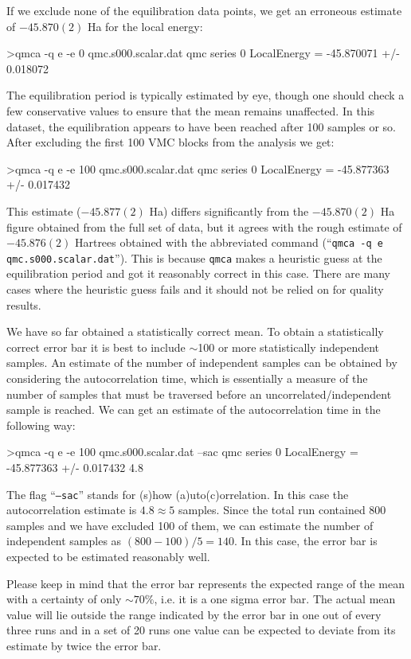If we exclude none of the equilibration data points, we get an 
erroneous estimate of $-45.870(2)$ Ha for the local energy:
\begin{shade}
>qmca -q e -e 0 qmc.s000.scalar.dat 
qmc  series 0  LocalEnergy           =  -45.870071 +/- 0.018072
\end{shade}
\noindent
The equilibration period is typically estimated by eye, though one should
check a few conservative values to ensure that the mean remains 
unaffected.  In this dataset, the equilibration appears to have been 
reached after 100 samples or so.  After excluding the first 100 
VMC blocks from the analysis we get:
\begin{shade}
>qmca -q e -e 100 qmc.s000.scalar.dat 
qmc  series 0  LocalEnergy           =  -45.877363 +/- 0.017432
\end{shade}
\noindent
This estimate ($-45.877(2)$ Ha) differs significantly from the 
$-45.870(2)$ Ha figure obtained from the full set of data, but it 
agrees with the rough estimate of $-45.876(2)$ Hartrees obtained 
with the abbreviated command (``\texttt{qmca -q e qmc.s000.scalar.dat}'').
This is because \texttt{qmca} makes a heuristic guess at the 
equilibration period and got it reasonably correct in this case. 
There are many cases where the heuristic guess fails and it should not 
be relied on for quality results.

We have so far obtained a statistically correct mean.  To obtain 
a statistically correct error bar it is best to include $\sim$100 or more 
statistically independent samples.  An estimate of the number 
of independent samples can be obtained by considering the 
autocorrelation time, which is essentially a measure of the number of 
samples that must be traversed before an uncorrelated/independent sample 
is reached.  We can get an estimate of the autocorrelation time 
in the following way:
\begin{shade}
>qmca -q e -e 100 qmc.s000.scalar.dat --sac
qmc  series 0  LocalEnergy           =  -45.877363 +/- 0.017432    4.8 
\end{shade}
\noindent
The flag ``\texttt{--sac}'' stands for (s)how (a)uto(c)orrelation.  
In this case the autocorrelation estimate is $4.8\approx 5$ samples. 
Since the total run contained 800 samples and we have excluded 100 of 
them, we can estimate the number of independent samples as 
$(800-100)/5=140$.  In this case, the error bar is expected to be 
estimated reasonably well.

Please keep in mind that the error bar represents the expected range
of the mean with a certainty of only $\sim 70\%$, i.e. it is a one
sigma error bar.  The actual mean value will lie outside the range
indicated by the error bar in one out of every three runs and in a set
of 20 runs one value can be expected to deviate from its estimate by
twice the error bar.


